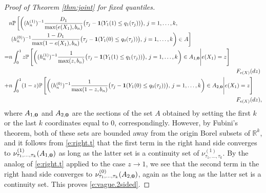 \documentclass[12pt]{amsart}
\newcommand{\bbr}{\mathbb{R}}
\newcommand{\LFe}{F_{e(X)}}
\newcommand{\1}{\mathbbm{1}}
\newcommand{\0}{\mathbf{0}}
\newcommand{\one}{\mathbf{1}}
\theoremstyle{plain}
\theoremstyle{definition}
\newcommand{\bbP}{\mathbb{P}}
\begin{document}
\begin{proof}[Proof of Theorem \ref{thm:joint} for fixed quantiles]
\begin{align*}
&n \bbP\left[\left( (h_n^{(1)})^{-1}\frac{D_1}{\max(e(X_1),b_n)}
  \bigl( \tau_j-\one(Y_1(1)\leq q_1(\tau_j))\bigr), \, j=1,\ldots,    k, \, \right.\right. \\ 
 & \left.\left.   (h_n^{(0)})^{-1}\frac{1-D_1}{\max(1-e(X_1),b_n)}
  \bigl( \tau_j-\one(Y_1(0)\leq q_0(\tau_j))\bigr), \, j=1,\ldots,    k
  \right)\in A\right] \\ 
 =&n\int_0^1 z\bbP\left[\left((h_n^{(1)})^{-1}\frac{1}{\max(z,b_n)}    \bigl( \tau_j-\one(Y_1(1)\leq q_1(\tau_j))\bigr), \, j=1,\ldots,    k\right) 
 \in A_{1,{\bf 0}}\Bigg| e(X_1)=z 
 \right] \\
 & \hskip 5.5in \LFe(dz)\\
 +& n\int_0^1 (1-z)\bbP\left[\left((h_n^{(0)})^{-1}\frac{1}{\max(1-z,b_n)}    \bigl( \tau_j-\one(Y_1(0)\leq q_0(\tau_j))\bigr), \, j=1,\ldots,    k\right) 
 \in A_{2,{\bf 0}}\Bigg| e(X_1)=z 
 \right] \\
 & \hskip 5.5in \LFe(dz), 
\end{align*}
where $A_{1,{\bf 0}}$ and $A_{2,{\bf 0}}$ are the sections of the set $A$ obtained by setting the first $k$ or the last $k$ coordinates equal to 0, correspondingly. However, by Fubini's theorem, both of these sets are bounded away from the origin Borel subsets of $\bbr^k$, and it follows from \eqref{e:right.t} that the first term in the right hand side converges to $\nu^{(1)}_{\tau_1,\ldots, \tau_k}(A_{1,{\bf 0}})$ as long as the latter set is a continuity set of $\nu^{(1)}_{\tau_1,\ldots, \tau_k}$. By the analog of \eqref{e:right.t} applied to the case $z\to 1$,  we see that the second term in the right hand side converges to $\nu^{(0)}_{\tau_1,\ldots, \tau_k}(A_{2,{\bf 0}})$, again as the long as the latter set is a continuity set. This proves \eqref{e:vague.2sided}.


\end{proof}
\end{document}
